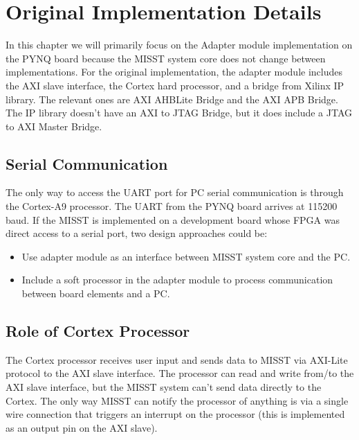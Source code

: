 \documentclass[]{report}
\begin{document}
\chapter{Original Implementation Details}
\label{c original imp details}

In this chapter we will primarily focus on the Adapter module implementation on the PYNQ board because the MISST system core does not change between implementations. For the original implementation, the adapter module includes the AXI slave interface, the Cortex hard processor, and a bridge from Xilinx IP library. The relevant ones are AXI AHBLite Bridge and the AXI APB Bridge. The IP library doesn't have an AXI to JTAG Bridge, but it does include a JTAG to AXI Master Bridge.   

\section{Serial Communication}
The only way to access the UART port for PC serial communication is through the Cortex-A9 processor. The UART from the PYNQ board arrives at 115200 baud. If the MISST is implemented on a development board whose FPGA was direct access to a serial port, two design approaches could be:
\begin{itemize}
	\item Use adapter module as an interface between MISST system core and the PC.
	\item Include a soft processor in the adapter module to process communication between board elements and a PC.
\end{itemize}


\section{Role of Cortex Processor}
 The Cortex processor receives user input and sends data to MISST via AXI-Lite protocol to the AXI slave interface. The processor can read and write from/to the AXI slave interface, but the MISST system can't send data directly to the Cortex. The only way MISST can notify the processor of anything is via a single wire connection that triggers an interrupt on the processor (this is implemented as an output pin on the AXI slave). 
 
\end{document}
